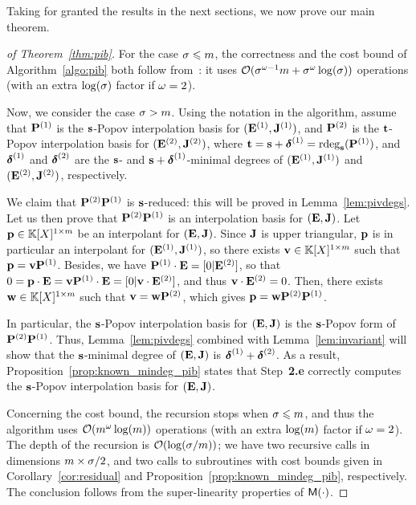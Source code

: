\documentclass[preprint]{sig-alternate-05-2015}
\begin{document}
Taking for granted the results in the next sections, we now prove our main
theorem.

\begin{proof}[of Theorem~\ref{thm:pib}]
For the case $\order \le \rdim$, the correctness and the cost bound of
Algorithm~\ref{algo:pib} both follow from~\cite[Theorem~1.4]{JeNeScVi15}: it
uses $\bigO{\order^{\expmatmul-1}\rdim + \order^\expmatmul \log(\order)}$
operations (with an extra $\log(\order)$ factor if $\expmatmul=2$).

Now, we consider the case $\order > \rdim$. Using the notation in the
algorithm, assume that $\intBasis^{(1)}$ is the $\shifts$-Popov interpolation
basis for $(\evMat^{(1)},\mulmat^{(1)})$, and $\intBasis^{(2)}$ is the
$\shifts[t]$-Popov interpolation basis for $(\evMat^{(2)},\mulmat^{(2)})$,
where $\shifts[t] = \shifts + \minDegs^{(1)} =
\rdeg[\shifts]{\intBasis^{(1)}}$, and $\minDegs^{(1)}$ and $\minDegs^{(2)}$ are
the $\shifts$- and $\shifts+\minDegs^{(1)}$-minimal degrees of
$(\evMat^{(1)},\mulmat^{(1)})$ and $(\evMat^{(2)},\mulmat^{(2)})$,
respectively.

We claim that $\intBasis^{(2)} \intBasis^{(1)}$ is $\shifts$-reduced:
this will be proved in Lemma~\ref{lem:pivdegs}. Let us then prove that
$\intBasis^{(2)} \intBasis^{(1)}$ is an interpolation basis for
$(\evMat,\mulmat)$. Let $\row{p} \in
\polMatSpace[1][\rdim]$ be an interpolant for $(\evMat,\mulmat)$. Since
$\mulmat$ is upper triangular, $\row{p}$ is in particular an interpolant for
$(\evMat^{(1)},\mulmat^{(1)})$, so there exists $\row{v} \in
\polMatSpace[1][\rdim]$ such that $\row{p} = \row{v} \intBasis^{(1)}$.
Besides, we have $\intBasis^{(1)} \mul \evMat = [0 | \evMat^{(2)}]$, so that $0
= \row{p} \mul \evMat = \row{v} \intBasis^{(1)} \mul \evMat = [0 | \row{v} \mul
\evMat^{(2)}]$, and thus $\row{v} \mul \evMat^{(2)} = 0$.  Then, there exists
$\row{w} \in \polMatSpace[1][\rdim]$ such that $\row{v} = \row{w}
\intBasis^{(2)}$, which gives $\row{p} = \row{w} \intBasis^{(2)}
\intBasis^{(1)}$.

In particular, the $\shifts$-Popov interpolation basis for $(\evMat,\mulmat)$
is the $\shifts$-Popov form of $\intBasis^{(2)} \intBasis^{(1)}$. Thus,
Lemma~\ref{lem:pivdegs} combined with Lemma~\ref{lem:invariant} will show that the
$\shifts$-minimal degree of $(\evMat,\mulmat)$ is $\minDegs^{(1)} +
\minDegs^{(2)}$. As a result, Proposition~\ref{prop:known_mindeg_pib} states that
Step~\textbf{2.e} correctly computes the $\shifts$-Popov interpolation basis
for $(\evMat,\mulmat)$.

Concerning the cost bound, the recursion stops when $\order \le
\rdim$, and thus the algorithm uses $\bigO{\rdim^\expmatmul \log(\rdim)}$
operations (with an extra $\log(\rdim)$ factor if $\expmatmul=2$). The depth of
the recursion is $\bigO{\log(\order/\rdim)}$; we have two recursive calls in
dimensions $\rdim \times \order/2$, and two calls to subroutines with cost
bounds given in Corollary~\ref{cor:residual} and
Proposition~\ref{prop:known_mindeg_pib}, respectively. The conclusion follows
from the super-linearity properties of $\polmultime{\cdot}$.
\end{proof}
\end{document}
